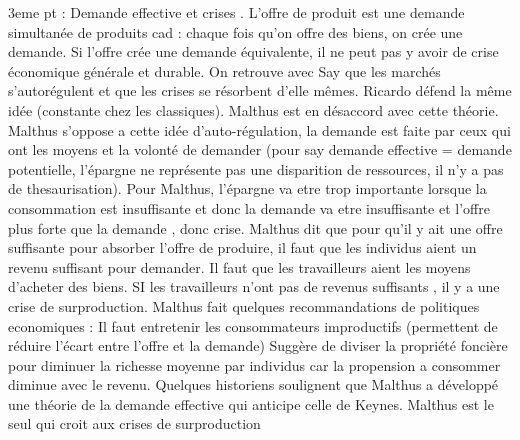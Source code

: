 \documentclass{article}
\begin{document}
3eme pt : Demande effective et crises . L'offre de produit est une demande simultanée de produits cad : chaque fois qu'on offre des biens, on crée une demande. Si l'offre crée une demande équivalente, il ne peut pas y avoir de crise économique générale et durable. On retrouve avec Say que les marchés s'autorégulent et que les crises se résorbent d'elle mêmes. Ricardo défend la même idée (constante chez les classiques). Malthus est en désaccord avec cette théorie.
Malthus s'oppose a cette idée d'auto-régulation, la demande est faite par ceux qui ont les moyens et la volonté de demander (pour say demande effective = demande potentielle, l'épargne ne représente pas une disparition de ressources, il n'y a pas de thesaurisation).
Pour Malthus, l'épargne va etre trop importante lorsque la consommation est insuffisante et donc la demande va etre insuffisante et l'offre plus forte que la demande , donc crise.
Malthus dit que pour qu'il y ait une offre suffisante pour absorber l'offre de produire, il faut que les individus aient un revenu suffisant pour demander. Il faut que les travailleurs aient les moyens d'acheter des biens. SI les travailleurs n'ont pas de revenus suffisants , il y a une crise de surproduction.
Malthus fait quelques recommandations de politiques economiques : 
Il faut entretenir les consommateurs improductifs  (permettent de réduire l'écart entre l'offre et la demande)
Suggère de diviser la propriété foncière pour diminuer la richesse moyenne par individus car la propension a consommer diminue avec le revenu. Quelques historiens soulignent que Malthus a développé une théorie de la demande effective qui anticipe celle de Keynes. Malthus est le seul qui croit aux crises de surproduction
\end{document}
